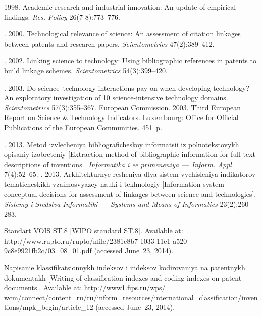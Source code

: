 \begin{multicols}{2}
{{\begin{thebibliography}{99}
 1998. Academic research and industrial innovation: An update of
empirical findings. \textit{Res. Policy} 26(7-8):773--776.

. 2000. Technological
relevance of science: An assessment of citation linkages between patents and research
papers. \textit{Scientometrics} 47(2):389--412.

. 2002. Linking science to technology: Using bibliographic references
in patents to build linkage schemes. \textit{Scientometrics} 54(3):399--420.


. 2003. Do science--technology interactions pay on when developing
technology? An exploratory investigation of 10 science-intensive technology domains.
\textit{Scientometrics} 57(3):355--367.
European Commission. 2003. Third European Report on Science \& Technology
Indicators. Luxembourg: Office for Official Publications of the European Communities.
451~p.

. 2013. Metod
izvlecheniya bibliograficheskoy informatsii iz polnotekstovykh opisaniy izobreteniy
[Extraction method of bibliographic information for full-text descriptions of inventions].
\textit{Informatika i ee primeneniya}~--- \textit{Inform. Appl.} 7(4):52--65.
. 2013.
Arkhitekturnye resheniya dlya sis\-tem vychisleniya indikatorov tematicheskikh
vzaimo\-svya\-zey nauki i tekhnologiy [Information system conceptual decisions for
assessment of linkages between science and technologies]. \textit{Sistemy i Sredstva
Informatiki}~--- \textit{Systems and Means of Informatics} 23(2):260--283.



Standart VOIS ST.8 [WIPO standard ST.8]. Available at: {\sf
http://www.rupto.ru/rupto/nfile/2381c8b7-1033-11e1-a520-9c8e9921fb2c/03\_08\_01.pdf} (accessed June~23, 2014).

Napisanie klassifikatsionnykh indeksov i indeksov kodirovaniya na patentnykh
dokumentakh [Writing of classification indexes and coding indexes on patent
documents]. Available at: {\sf
http://www1.fips.ru/wps/ wcm/connect/content\_ru/ru/inform\_resources/\linebreak international\_classification/inventions/mpk\_begin/\linebreak article\_12} (accessed June~23, 2014).


\end{thebibliography}}}
\end{multicols}
